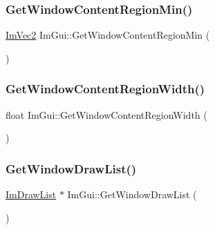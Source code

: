 \hypertarget{namespace_im_gui_a790123aa15c266798f35050ba36b7197}{}\label{namespace_im_gui_a790123aa15c266798f35050ba36b7197} 
\subsubsection{\texorpdfstring{Get\+Window\+Content\+Region\+Min()}{GetWindowContentRegionMin()}}
{\footnotesize\ttfamily \hyperlink{struct_im_vec2}{Im\+Vec2} Im\+Gui\+::\+Get\+Window\+Content\+Region\+Min (\begin{DoxyParamCaption}{ }\end{DoxyParamCaption})}

\hypertarget{namespace_im_gui_a87c1de99e670bff87c43bfb07bbf898f}{}\label{namespace_im_gui_a87c1de99e670bff87c43bfb07bbf898f} 
\subsubsection{\texorpdfstring{Get\+Window\+Content\+Region\+Width()}{GetWindowContentRegionWidth()}}
{\footnotesize\ttfamily float Im\+Gui\+::\+Get\+Window\+Content\+Region\+Width (\begin{DoxyParamCaption}{ }\end{DoxyParamCaption})}

\hypertarget{namespace_im_gui_aa100c22a9feafe843fa12c66590cbda0}{}\label{namespace_im_gui_aa100c22a9feafe843fa12c66590cbda0} 
\subsubsection{\texorpdfstring{Get\+Window\+Draw\+List()}{GetWindowDrawList()}}
{\footnotesize\ttfamily \hyperlink{struct_im_draw_list}{Im\+Draw\+List} $\ast$ Im\+Gui\+::\+Get\+Window\+Draw\+List (\begin{DoxyParamCaption}{ }\end{DoxyParamCaption})}

\hypertarget{namespace_im_gui_a44d2bfb80e0d2dd232a553ab29a91b52}{}\label{namespace_im_gui_a44d2bfb80e0d2dd232a553ab29a91b52} 
